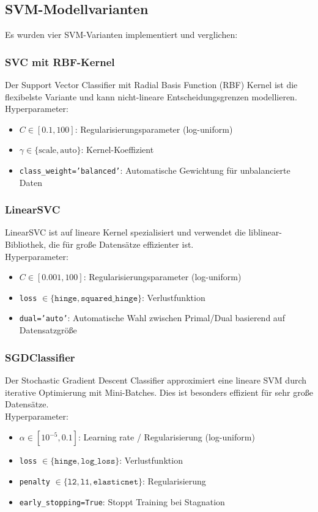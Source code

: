 \documentclass[12pt,oneside]{article}
\begin{document}
	\subsection{SVM-Modellvarianten}
	Es wurden vier SVM-Varianten implementiert und verglichen:
	\subsubsection{SVC mit RBF-Kernel}
	Der Support Vector Classifier mit Radial Basis Function (RBF) Kernel ist die flexibelste Variante und kann nicht-lineare Entscheidungsgrenzen modellieren. \\
	Hyperparameter:
	\begin{itemize}
		\item $C \in [0.1, 100]$: Regularisierungsparameter (log-uniform)
		\item $\gamma \in \{\text{scale}, \text{auto}\}$: Kernel-Koeffizient
		\item \texttt{class\_weight='balanced'}: Automatische Gewichtung für unbalancierte Daten
	\end{itemize}
	
	\subsubsection{LinearSVC}
	LinearSVC ist auf lineare Kernel spezialisiert und verwendet die liblinear-Bibliothek, die für große Datensätze effizienter ist. \\
	Hyperparameter:
	\begin{itemize}
		\item $C \in [0.001, 100]$: Regularisierungsparameter (log-uniform)
		\item \texttt{loss} $\in \{\texttt{hinge}, \texttt{squared\_hinge}\}$: Verlustfunktion
		\item \texttt{dual='auto'}: Automatische Wahl zwischen Primal/Dual basierend auf Datensatzgröße
	\end{itemize}
	
	\subsubsection{SGDClassifier}
	Der Stochastic Gradient Descent Classifier approximiert eine lineare SVM durch iterative Optimierung mit Mini-Batches. Dies ist besonders effizient für sehr große Datensätze. \\
	Hyperparameter:
	\begin{itemize}
		\item $\alpha \in [10^{-5}, 0.1]$: Learning rate / Regularisierung (log-uniform)
		\item \texttt{loss} $\in \{\texttt{hinge}, \texttt{log\_loss}\}$: Verlustfunktion
		\item \texttt{penalty} $\in \{\texttt{l2}, \texttt{l1}, \texttt{elasticnet}\}$: Regularisierung
		\item \texttt{early\_stopping=True}: Stoppt Training bei Stagnation
	\end{itemize}
\end{document}
